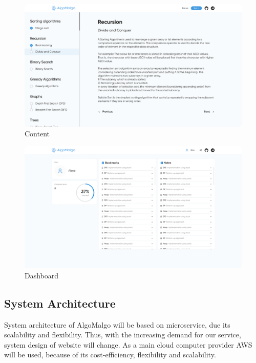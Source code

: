 \begin{figure}[h]
    \centering
    \includegraphics[scale=0.3]{figures/content.png}
    \caption{Content}
    \label{fig:gp}
\end{figure}


\pagebreak

\begin{figure}[h]
    \centering
    \includegraphics[scale=0.3]{figures/dashboard.png}
    \caption{Dashboard}
    \label{fig:gp}
\end{figure}


\pagebreak

\subsection{System Architecture}
System architecture of AlgoMalgo will be based on microservice, due its scalability and flexibility. Thus, with the increasing demand for our service, system design of website will change. As a main cloud computer provider AWS will be used, because of its cost-efficiency, flexibility and scalability.


